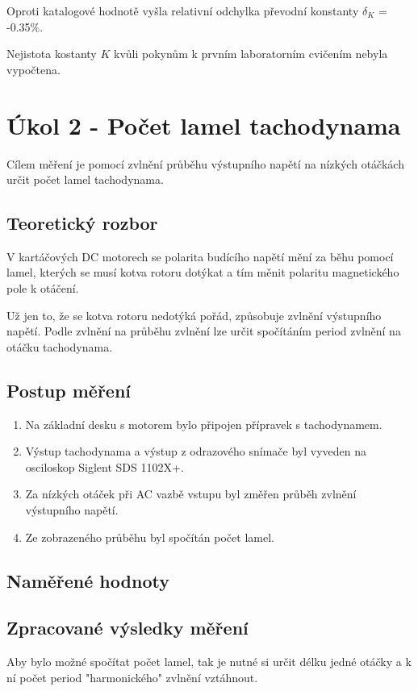 \documentclass{protokol}
\begin{document}
        Oproti katalogové hodnotě vyšla relativní odchylka převodní konstanty \linebreak $\delta_K$ = -0.35$\%$. 

        Nejistota kostanty $K$ kvůli pokynům k prvním laboratorním cvičením nebyla vypočtena.

\pagebreak

\section{Úkol 2 - Počet lamel tachodynama}
    Cílem měření je pomocí zvlnění průběhu výstupního napětí na nízkých otáčkách určit počet lamel tachodynama. 
    \subsection{Teoretický rozbor}
        V kartáčových DC motorech se polarita budícího napětí mění za běhu pomocí lamel, kterých se musí kotva rotoru dotýkat a tím měnit polaritu magnetického pole k otáčení.
        
        Už jen to, že se kotva rotoru nedotýká pořád, způsobuje zvlnění výstupního napětí. Podle zvlnění na průběhu zvlnění lze určit spočítáním period zvlnění na otáčku tachodynama.
    \subsection{Postup měření}
        \begin{enumerate}
             \item Na základní desku s motorem bylo připojen přípravek s tachodynamem.
             \item Výstup tachodynama a výstup z odrazového snímače byl vyveden na osciloskop Siglent SDS 1102X+.
             \item Za nízkých otáček při AC vazbě vstupu byl změřen průběh zvlnění výstupního napětí.
             \item Ze zobrazeného průběhu byl spočítán počet lamel.
        \end{enumerate}
    \subsection{Naměřené hodnoty}

    \pagebreak
    \subsection{Zpracované výsledky měření}
        Aby bylo možné spočítat počet lamel, tak je nutné si určit délku jedné otáčky a k ní počet period "harmonického" zvlnění vztáhnout.
\end{document}
